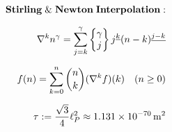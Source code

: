 \documentclass[preview]{standalone}
\begin{document}
\begin{align*}
\special{dvisvgm:raw <g id='unique000'>}\mathbf{Stirling\;\&\;Newton\;Interpolation:}\\[6pt]\nabla^k n^\gamma = \sum_{j=k}^\gamma \left\{\begin{matrix}\gamma\\j\end{matrix}\right\} j^{\underline{k}}(n-k)^{\underline{j-k}}\\[6pt]f(n) = \sum_{k=0}^n \binom{n}{k}(\nabla^k f)(k)\quad(n \ge 0)\\[6pt]\tau := \frac{\sqrt{3}}{4}\ell_P^2 \approx 1.131\times 10^{-70}\,\mathrm{m}^2\special{dvisvgm:raw </g>}
\end{align*}
\end{document}
